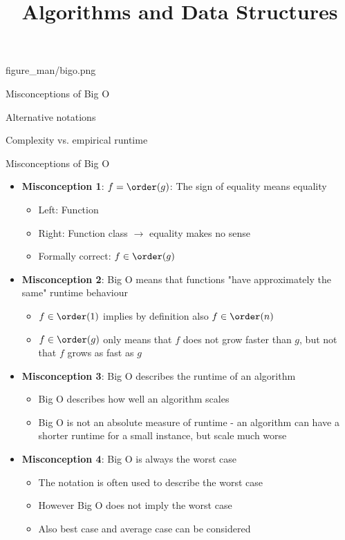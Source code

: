 \documentclass[11pt,compress,t,notes=noshow, xcolor=table]{beamer}
\title{Algorithms and Data Structures}
\begin{document}
{figure_man/bigo.png}
{
  \item Misconceptions of Big O
  \item Alternative notations
  \item Complexity vs. empirical runtime
}


\begin{vbframe}{Misconceptions of Big O}

\begin{itemize}

\item \textbf{Misconception 1}: $f = \order(g)$: The sign of equality means equality \\
  \begin{itemize}
  \item Left: Function
  \item Right: Function class $\to$ equality makes no sense
  \item Formally correct: $f \in \order(g)$
  \end{itemize}

\item \textbf{Misconception 2}: Big O means that functions "have approximately the same" runtime behaviour
  \begin{itemize}
  \item $f \in \order(1)$ implies by definition also $f \in \order(n)$
  \item $f \in \order(g)$ only means that $f$ does not grow faster than $g$, but not that $f$ grows as fast as $g$
  \end{itemize}
  \framebreak
\item \textbf{Misconception 3}: Big O describes the runtime of an algorithm
  \begin{itemize}
  \item Big O describes how well an algorithm scales
  \item Big O is not an absolute measure of runtime - an algorithm can have a shorter runtime for a small instance, but scale much worse
  \end{itemize}
\item \textbf{Misconception 4}: Big O is always the worst case
  \begin{itemize}
  \item The notation is often used to describe the worst case
  \item However Big O does not imply the worst case
  \item Also best case and average case can be considered
  \end{itemize}
\end{itemize}
\end{vbframe}
\end{document}
